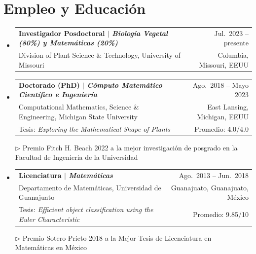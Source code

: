 \documentclass[A4,11pt]{article}
\makeatletter
\newcommand{\CVSubheading}[4]{
	\vspace{-2pt}\item
	\begin{tabular*}{0.97\textwidth}[t]{l@{\extracolsep{\fill}}r}
		\textbf{#1} & #2 \\
		\small#3 & \small #4 \\
	\end{tabular*}\vspace{-7pt}
}
\newcommand{\CVTubheading}[7]{
	\vspace{0pt}\item
	\begin{tabular*}{0.97\textwidth}[t]{l@{\extracolsep{\fill}}r}
		\textbf{#1} & #2 \\
		\small#3 & \small #4 \\
		\small#5 & \small #6 \\
	\end{tabular*}
	{\small $\rhd$ #7} \vspace{0pt}
}
\newcommand{\CVSubHeadingListStart}{\begin{itemize}[leftmargin=0.5cm, label={}]}
\newcommand{\CVSubHeadingListEnd}{\end{itemize}}
\makeatother
\begin{document}
		\section{Empleo y Educaci\'on}
		\CVSubHeadingListStart
		\CVSubheading
		{{Investigador Posdoctoral $|$ \emph{\small{Biolog\'ia Vegetal (80\%) y Matem\'aticas (20\%)}}}}{Jul.~2023 -- presente}
		{Division of Plant Science \& Technology, University of Missouri}{Columbia, Missouri, EEUU}
		\CVTubheading
		{{Doctorado (PhD) $|$ \emph{\small{C\'omputo Matem\'atico Cient\'ifico e Ingenier\'ia}}}}{Ago.~2018 -- Mayo 2023}
		{Computational Mathematics, Science \& Engineering, Michigan State University}{East Lansing, Michigan, EEUU}
		{Tesis: \emph{Exploring the Mathematical Shape of Plants}}{Promedio: 4.0/4.0}{Premio Fitch H. Beach 2022 a la mejor investigaci\'on de posgrado en la Facultad de Ingenieria de la Universidad}
		\CVTubheading
		{{Licenciatura $|$ \emph{\small{Matem\'aticas}}}}{Ago.~2013 -- Jun.~2018}
		{Departamento de Matem\'aticas, Universidad de Guanajuato}{Guanajuato, Guanajuato, M\'exico}
		{Tesis: \emph{Efficient object classification using the Euler Characteristic}}{Promedio: 9.85/10}{Premio Sotero Prieto 2018 a la Mejor Tesis de Licenciatura en Matem\'aticas en M\'exico}
		\CVSubHeadingListEnd
		

		
\end{document}
